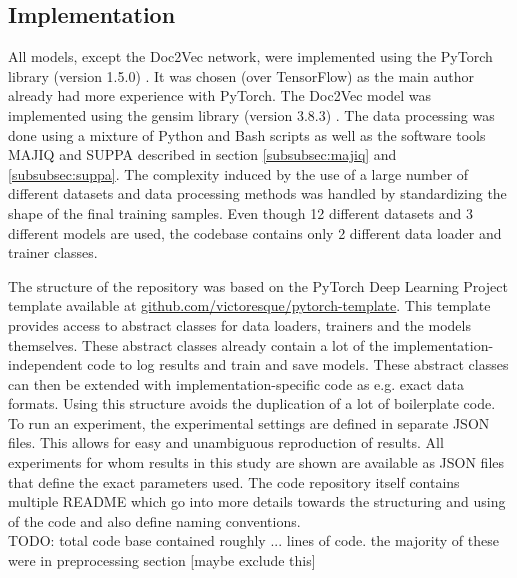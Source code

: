 \subsection{Implementation} \label{subsec:implementation_details}
All models, except the Doc2Vec network, were implemented using the PyTorch library (version 1.5.0) \cite{pytorch}. It was chosen (over TensorFlow) as the main author already had more experience with PyTorch. The Doc2Vec model was implemented using the gensim library (version 3.8.3) \cite{gensim}. The data processing was done using a mixture of Python and Bash scripts as well as the software tools MAJIQ and SUPPA described in section \ref{subsubsec:majiq} and \ref{subsubsec:suppa}. The complexity induced by the use of a large number of different datasets and data processing methods was handled by standardizing the shape of the final training samples. Even though 12 different datasets and 3 different models are used, the codebase contains only 2 different data loader and trainer classes.


The structure of the repository was based on the PyTorch Deep Learning Project template available at \url{github.com/victoresque/pytorch-template}. This template provides access to abstract classes for data loaders, trainers and the models themselves. These abstract classes already contain a lot of the implementation-independent code to log results and train and save models. These abstract classes can then be extended with implementation-specific code as e.g. exact data formats. Using this structure avoids the duplication of a lot of boilerplate code.\\
To run an experiment, the experimental settings are defined in separate JSON files. This allows for easy and unambiguous reproduction of results. All experiments for whom results in this study are shown are available as JSON files that define the exact parameters used.
The code repository itself contains multiple README which go into more details towards the structuring and using of the code and also define naming conventions.\\

TODO: total code base contained roughly ... lines of code. the majority of these were in preprocessing section [maybe exclude this]

